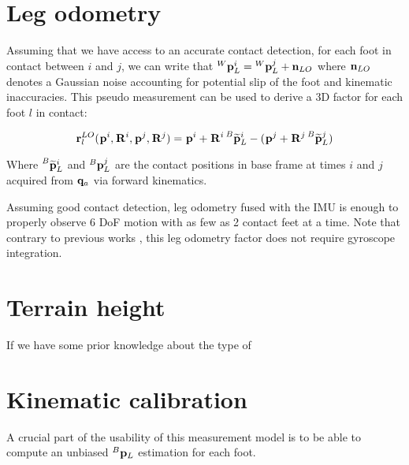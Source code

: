 \section{Leg odometry}
Assuming that we have access to an accurate contact detection, for each foot in contact between \keyframes $i$ and $j$, we can write that 
$\prescript{W}{}{{\bf p}}_{L}^i = \prescript{W}{}{{\bf p}}_{L}^j + {\bf n}_{LO}$ where ${\bf n}_{LO}$ denotes a Gaussian noise accounting for potential slip of the foot and kinematic inaccuracies. 
This pseudo measurement can be used to derive a 3D factor for each foot $l$ in contact:

\begin{equation}
    {\bf r}^{LO}_l(\prescript{}{}{{\bf p}}_{}^i, \prescript{}{}{{\bf R}}_{}^i, \prescript{}{}{{\bf p}}_{}^j, \prescript{}{}{{\bf R}}_{}^j) = \prescript{}{}{{\bf p}}_{}^i + \prescript{}{}{{\bf R}}_{}^i \prescript{B}{}{\widetilde{{\bf p}}}_{L}^i - (\prescript{}{}{{\bf p}}_{}^j + \prescript{}{}{{\bf R}}_{}^j \prescript{B}{}{\widetilde{{\bf p}}}_{L}^j)
\end{equation}

Where $\prescript{B}{}{\widetilde{{\bf p}}}_{L}^i$ and $\prescript{B}{}{{\bf p}}_{L}^j$ are the contact positions in base frame at times $i$ and $j$ acquired from ${\bf q}_a$ via forward kinematics. 

Assuming good contact detection, leg odometry fused with the IMU is enough to properly observe 6 DoF motion with as few as 2 contact feet at a time. 
Note that contrary to previous works \cite{hartley2018legged, wisth2020preintegrated}, this leg odometry factor does not require gyroscope integration.

\section{Terrain height}

If we have some prior knowledge about the type of 

\section{Kinematic calibration}
A crucial part of the usability of this measurement model is to be able to compute an unbiased $\prescript{B}{}{{\bf p}}_{L}$ estimation for each foot.
